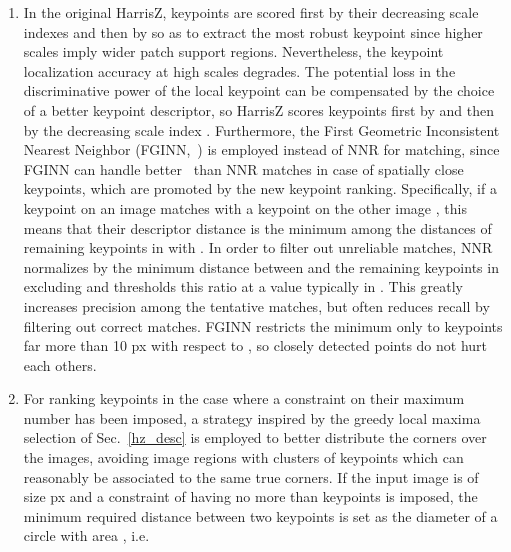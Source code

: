 \documentclass[times,twocolumn,final,authoryear]{elsarticle}
\begin{document}
\begin{enumerate}
	\item\label{s1} In the original HarrisZ, keypoints are scored first by their decreasing scale indexes  and then by  so as to extract the most robust keypoint since higher scales imply wider patch support regions. Nevertheless, the keypoint localization accuracy at high scales degrades. The potential loss in the discriminative power of the local keypoint can be compensated by the choice of a better keypoint descriptor, so HarrisZ scores keypoints first by  and then by the decreasing scale index . Furthermore, the First Geometric Inconsistent Nearest Neighbor (FGINN,~\cite{mods}) is employed instead of NNR for matching, since FGINN can handle better~\cite{imw2020} than NNR matches in case of spatially close keypoints, which are promoted by the new keypoint ranking. Specifically, if a keypoint  on an image  matches with a keypoint  on the other image , this means that their descriptor distance is the minimum  among the distances of remaining keypoints in  with . In order to filter out unreliable matches, NNR normalizes  by the minimum distance  between  and the remaining keypoints in  excluding  and thresholds this ratio at a value typically in . This greatly increases precision among the tentative matches, but often reduces recall by filtering out correct matches. FGINN restricts the minimum  only to keypoints far more than 10 px with respect to , so closely detected points do not hurt each others.
	\item\label{s2} For ranking keypoints in the case where a constraint on their maximum number has been imposed, a strategy inspired by the greedy local maxima selection of Sec.~\ref{hz_desc} is employed to better distribute the corners over the images, avoiding image regions with clusters of keypoints which can reasonably be associated to the same true corners. If the input image is of size  px and a constraint of having no more than  keypoints is imposed, the minimum required distance  between two keypoints is set as the diameter of a circle with area , i.e.
	\vspace{-0.5em}
	

\end{enumerate}
\end{document}
